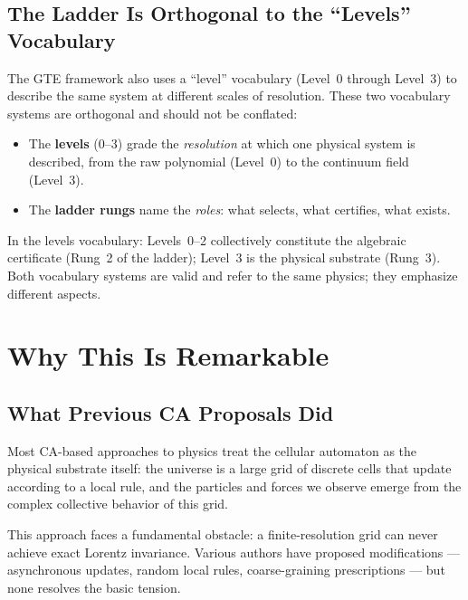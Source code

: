 \documentclass[11pt,a4paper]{article}
\newcommand{\term}[1]{\textbf{#1}}
\theoremstyle{definition}
\begin{document}
\subsection{The Ladder Is Orthogonal to the ``Levels'' Vocabulary}

The GTE framework also uses a ``level'' vocabulary (Level~0 through Level~3)
to describe the same system at different scales of resolution.
These two vocabulary systems are orthogonal and should not be conflated:

\begin{itemize}
  \item The \term{levels} (0--3) grade the \emph{resolution} at which one physical
    system is described, from the raw polynomial (Level~0) to the continuum
    field (Level~3).
  \item The \term{ladder rungs} name the \emph{roles}: what selects, what
    certifies, what exists.
\end{itemize}

In the levels vocabulary: Levels~0--2 collectively constitute the algebraic
certificate (Rung~2 of the ladder); Level~3 is the physical substrate (Rung~3).
Both vocabulary systems are valid and refer to the same physics; they emphasize
different aspects.

\section{Why This Is Remarkable}
\label{sec:remarkable}

\subsection{What Previous CA Proposals Did}

Most CA-based approaches to physics treat the cellular automaton as the physical
substrate itself: the universe is a large grid of discrete cells that update
according to a local rule, and the particles and forces we observe emerge from the
complex collective behavior of this grid.

This approach faces a fundamental obstacle: a finite-resolution grid can never
achieve exact Lorentz invariance.  Various authors have proposed modifications ---
asynchronous updates, random local rules, coarse-graining prescriptions --- but
none resolves the basic tension.
\end{document}
